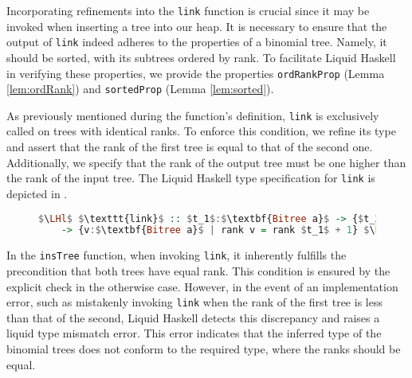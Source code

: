 \documentclass{clmthesis}
\begin{document}

Incorporating refinements into the \texttt{link} function is crucial since it may be invoked when inserting a tree into our heap. It is necessary to ensure that the output of \texttt{link} indeed adheres to the properties of a binomial tree. Namely, it should be sorted, with its subtrees ordered by rank. To facilitate Liquid Haskell in verifying these properties, we provide the properties \texttt{ordRankProp} (Lemma \ref{lem:ordRank}) and \texttt{sortedProp} (Lemma \ref{lem:sorted}).

As previously mentioned during the function's definition, \texttt{link} is exclusively called on trees with identical ranks. To enforce this condition, we refine its type and assert that the rank of the first tree is equal to that of the second one. Additionally, we specify that the rank of the output tree must be one higher than the rank of the input tree. The Liquid Haskell type specification for \texttt{link} is depicted in .

\begin{figure}[h]
\begin{lstlisting}[mathescape=true, language=haskell, caption={Liquid Type of \texttt{link}.},captionpos=b, label=fig:liquidlink]
$\LHl$ $\texttt{link}$ :: $t_1$:$\textbf{Bitree a}$ -> {$t_2$:$\textbf{Bitree a}$ | rank $t_1$ = rank $t_2$} 
	-> {v:$\textbf{Bitree a}$ | rank v = rank $t_1$ + 1} $\LHr$
\end{lstlisting}
\end{figure}
In the \texttt{insTree} function, when invoking \texttt{link}, it inherently fulfills the precondition that both trees have equal rank. This condition is ensured by the explicit check in the otherwise case. However, in the event of an implementation error, such as mistakenly invoking \texttt{link} when the rank of the first tree is less than that of the second, Liquid Haskell detects this discrepancy and raises a liquid type mismatch error. This error indicates that the inferred type of the binomial trees does not conform to the required type, where the ranks should be equal.
\end{document}
